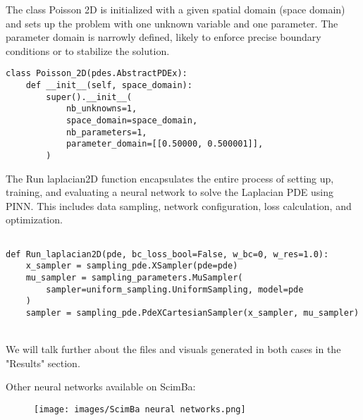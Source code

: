 \documentclass[12pt]{article}
\begin{document}
The class Poisson 2D is initialized with a given spatial domain (space domain) and sets up the problem with one unknown variable and one parameter.
The parameter domain is narrowly defined, likely to enforce precise boundary conditions or to stabilize the solution.
\begin{lstlisting}
class Poisson_2D(pdes.AbstractPDEx):
    def __init__(self, space_domain):
        super().__init__(
            nb_unknowns=1,
            space_domain=space_domain,
            nb_parameters=1,
            parameter_domain=[[0.50000, 0.500001]],
        )

\end{lstlisting}


The Run laplacian2D function encapsulates the entire process of setting up, training, and evaluating a neural network to solve the Laplacian PDE using PINN. This includes data sampling, network configuration, loss calculation, and optimization.

\begin{lstlisting}

def Run_laplacian2D(pde, bc_loss_bool=False, w_bc=0, w_res=1.0):
    x_sampler = sampling_pde.XSampler(pde=pde)
    mu_sampler = sampling_parameters.MuSampler(
        sampler=uniform_sampling.UniformSampling, model=pde
    )
    sampler = sampling_pde.PdeXCartesianSampler(x_sampler, mu_sampler)

\end{lstlisting}
\\
We will talk further about the files and visuals generated in both cases in the "Results" section.

Other neural networks available on ScimBa:

\begin{figure}[H]
    \centering
    \texttt{[image: images/ScimBa neural networks.png]}  

\end{figure}



\newpage
\end{document}
